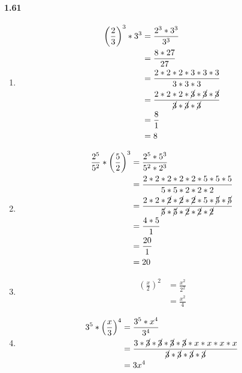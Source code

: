 \documentclass{article}
\newcommand\litem[1]{\item{\bfseries#1\space}}
\begin{document}
\paragraph{1.61}
\begin{enumerate}[label=\emph{\alph*})]
\litem{
\begin{align*}
  \left(\frac{2}{3}\right)^3 * 3^3 &= \frac{2^3 * 3^3}{3^3} \\
  &= \frac{8 * 27}{27} \\
  &= \frac{2 * 2 * 2 * 3 * 3 * 3}{3 * 3 * 3} \\ 
  &= \frac{2 * 2 * 2 * \cancel{3} * \cancel{3} * \cancel{3}}{\cancel{3} * \cancel{3} * \cancel{3}} \\
  &= \frac{8}{1} \\
  &= 8
\end{align*}
}
\litem{
\begin{align*}
  \frac{2^5}{5^2} * \left(\frac{5}{2}\right)^3 &= \frac{2^5 * 5^3}{5^2 * 2^3} \\
  &= \frac{2 * 2 * 2 * 2 * 2 * 5 * 5 * 5}{5 * 5 * 2 * 2 * 2} \\
  &= \frac{2 * 2 * \cancel{2} * \cancel{2} * \cancel{2} * 5 * \cancel{5} * \cancel{5}}{\cancel{5} * \cancel{5} * \cancel{2} * \cancel{2} * \cancel{2}} \\
  &= \frac{4 * 5}{1} \\
  &= \frac{20}{1} \\
  &= 20
\end{align*}
}
\litem{
\begin{align*}
  \left(\frac{x}{2}\right)^2 &= \frac{x^2}{2^2} \\
  &= \frac{x^2}{4}
\end{align*}
}
\litem{
\begin{align*}
  3^5 * \left(\frac{x}{3}\right)^4 &= \frac{3^5 * x^4}{3^4} \\
  &= \frac{3 * \cancel{3} * \cancel{3} * \cancel{3} * \cancel{3} * x * x * x * x}{\cancel{3} * \cancel{3} * \cancel{3} * \cancel{3}} \\
  &= 3x^4
\end{align*}
}
\end{enumerate}
\end{document}
